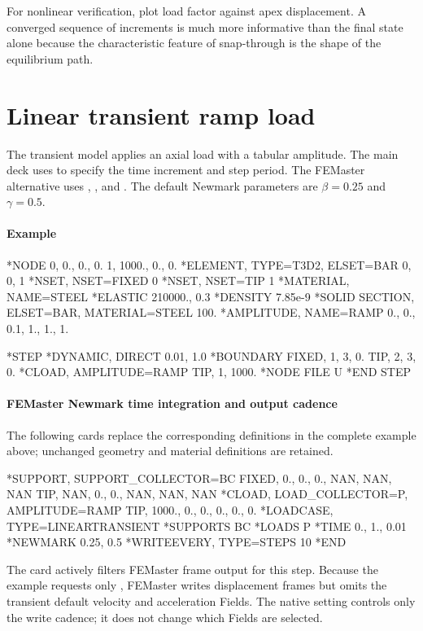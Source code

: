 For nonlinear verification, plot load factor against apex displacement. A converged sequence of increments is much more informative than the final state alone because the characteristic feature of snap-through is the shape of the equilibrium path.

\section{Linear transient ramp load}

The transient model applies an axial load with a tabular amplitude.
The main deck uses  to specify the time
increment and step period. The FEMaster alternative uses
, , and . The default
Newmark parameters are \(\beta=0.25\) and \(\gamma=0.5\).

\paragraph*{Example}

\begin{inputdeck}
*NODE
0,    0., 0., 0.
1, 1000., 0., 0.
*ELEMENT, TYPE=T3D2, ELSET=BAR
0, 0, 1
*NSET, NSET=FIXED
0
*NSET, NSET=TIP
1
*MATERIAL, NAME=STEEL
*ELASTIC
210000., 0.3
*DENSITY
7.85e-9
*SOLID SECTION, ELSET=BAR, MATERIAL=STEEL
100.
*AMPLITUDE, NAME=RAMP
0., 0., 0.1, 1., 1., 1.

*STEP
*DYNAMIC, DIRECT
0.01, 1.0
*BOUNDARY
FIXED, 1, 3, 0.
TIP, 2, 3, 0.
*CLOAD, AMPLITUDE=RAMP
TIP, 1, 1000.
*NODE FILE
U
*END STEP
\end{inputdeck}

\paragraph*{FEMaster Newmark time integration and output cadence}

The following cards replace the corresponding definitions in the
complete example above; unchanged geometry and material definitions
are retained.

\begin{inputdeck}
*SUPPORT, SUPPORT_COLLECTOR=BC
FIXED, 0., 0., 0., NAN, NAN, NAN
TIP, NAN, 0., 0., NAN, NAN, NAN
*CLOAD, LOAD_COLLECTOR=P, AMPLITUDE=RAMP
TIP, 1000., 0., 0., 0., 0., 0.
*LOADCASE, TYPE=LINEARTRANSIENT
*SUPPORTS
BC
*LOADS
P
*TIME
0., 1., 0.01
*NEWMARK
0.25, 0.5
*WRITEEVERY, TYPE=STEPS
10
*END
\end{inputdeck}

The  card actively filters FEMaster frame output for this step. Because the example requests only , FEMaster writes displacement frames but omits the transient default velocity and acceleration Fields. The native  setting controls only the write cadence; it does not change which Fields are selected.

